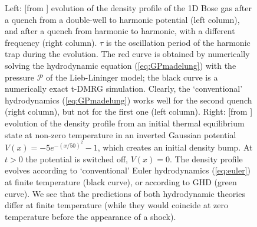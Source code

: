 \documentclass[onecolumn,amsfonts,showpacs,superscriptaddress]{revtex4-1}
\begin{document}
\begin{figure}
    \centering
    \caption{Left: [from \citep{peotta2014quantum}] evolution of the density profile of the 1D Bose gas after a quench from a double-well to harmonic potential (left column), and after a quench from harmonic to harmonic, with a different frequency (right column). $\tau$ is the oscillation period of the harmonic trap during the evolution. The red curve is obtained by numerically solving the hydrodynamic equation (\ref{eq:GPmadelung}) with the pressure $\mathcal{P}$ of the Lieb-Lininger model; the black curve is a numerically exact t-DMRG simulation. Clearly, the `conventional' hydrodynamics (\ref{eq:GPmadelung}) works well for the second quench (right column), but not for the first one (left column).
    Right: [from \citep{doyon2017large}] evolution of the density profile from an initial thermal equilibrium state at non-zero temperature in an inverted Gaussian potential $V(x) = -5e^{-(x/50)^2}-1$, which creates an initial density bump. At $t>0$ the potential is switched off, $V(x)=0$. The density profile evolves according to   `conventional' Euler hydrodynamics (\ref{eq:euler}) at finite temperature (black curve), or according to GHD (green curve). We see that the predictions of both hydrodynamic theories differ at finite temperature (while they would coincide at zero temperature before the appearance of a shock).}
    \label{fig:peotta_diventra}
\end{figure}
\end{document}
